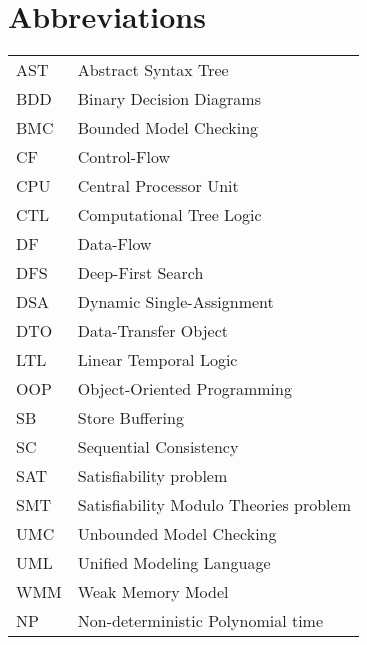 \chapter*{Abbreviations}


\noindent
\begin{longtable}{@{}p{}p{}@{}}
AST & Abstract Syntax Tree \\
BDD & Binary Decision Diagrams \\
BMC & Bounded Model Checking \\
CF  & Control-Flow \\
CPU & Central Processor Unit \\
CTL & Computational Tree Logic \\
DF  & Data-Flow \\
DFS & Deep-First Search \\
DSA & Dynamic Single-Assignment \\
DTO & Data-Transfer Object \\
LTL & Linear Temporal Logic \\
OOP & Object-Oriented Programming \\
SB  & Store Buffering \\
SC  & Sequential Consistency \\
SAT & Satisfiability problem \\
SMT & Satisfiability Modulo Theories problem \\
UMC & Unbounded Model Checking \\
UML & Unified Modeling Language \\
WMM & Weak Memory Model \\
NP  & Non-deterministic Polynomial time \\
\end{longtable}

